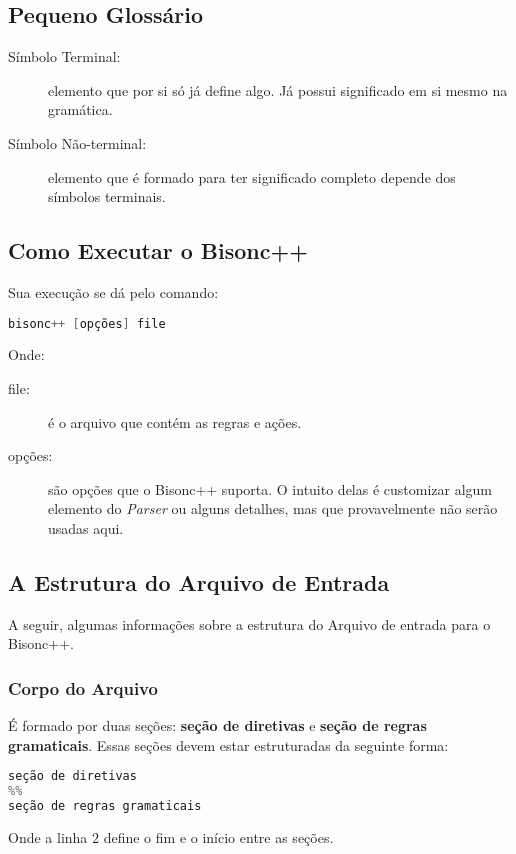 \begin{apendicesenv}
\subsection{Pequeno Glossário}
\begin{description}
\item[Símbolo Terminal:] elemento que por si só já define algo. Já possui significado em si mesmo na gramática.
\item[Símbolo Não-terminal: ] elemento que é formado para ter significado completo depende dos símbolos terminais.
\end{description}

\subsection{Como Executar o Bisonc++}
Sua execução se dá pelo comando:

\begin{lstlisting}[language=c, caption=Comando para Executar Bisonc++]
bisonc++ [opções] file
\end{lstlisting}

\par
\indent Onde:
\begin{description}
\item[file:] é o arquivo que contém as regras e ações.
\item[opções:] são opções que o Bisonc++ suporta. O intuito delas é customizar algum elemento do \textit{Parser} ou alguns detalhes, mas que provavelmente não serão usadas aqui.
\end{description}

\subsection{A Estrutura do Arquivo de Entrada}
A seguir, algumas informações sobre a estrutura do Arquivo de entrada para o Bisonc++.

\subsubsection{Corpo do Arquivo}

É formado por duas seções: \textbf{seção de diretivas} e \textbf{seção de regras gramaticais}. Essas seções devem estar estruturadas da seguinte forma:

\begin{lstlisting}[language=c, caption=Corpo do Arquivo do Bisonc++]
seção de diretivas
%%
seção de regras gramaticais
\end{lstlisting}
\par
\indent Onde a linha $2$ define o fim e o início entre as seções.


\end{apendicesenv}
